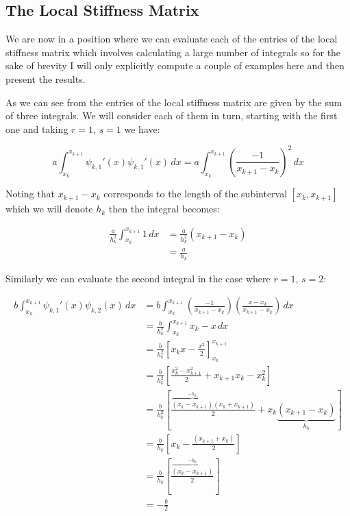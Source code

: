 \subsection{The Local Stiffness Matrix}\label{sec:oned-deterministic-local-stiffness}

We are now in a position where we can evaluate each of the entries of the local
stiffness matrix which involves calculating a large number of integrals so for
the sake of brevity I will only explicitly compute a couple of examples here
and then present the results.

As we can see from  the entries of
the local stiffness matrix are given by the sum of three integrals. We will
consider each of them in turn, starting with the first one and taking $r = 1$,
$s = 1$ we have:

\begin{equation*}
       a\int_{x_k}^{x_{k+1}}\psi_{k,1}'(x)\psi_{k,1}'(x)\, dx =
         a\int_{x_k}^{x_{k+1}}\left(\frac{-1}{x_{k+1} - x_k}\right)^2\, dx
\end{equation*}

Noting that $x_{k+1} - x_k$ corresponds to the length of the subinterval
$[x_k, x_{k+1}]$ which we will denote $h_k$ then the integral becomes:

\begin{align*}
    \frac{a}{h_k^2}\int_{x_k}^{x_{k+1}}1\, dx &= \frac{a}{h_k^2}(x_{k+1} - x_k) \\
          &= \frac{a}{h_k}
\end{align*}

Similarly we can evaluate the second integral in the case where $r=1$, $s=2$:

\begin{align*}
    b\int_{x_k}^{x_{k+1}}\psi_{k,1}'(x)\psi_{k,2}(x)\, dx
      &=  b\int_{x_k}^{x_{k+1}}\left(\frac{-1}{x_{k+1} - x_k}\right)
                               \left(\frac{x - x_k}{x_{k+1} - x_k}\right)\, dx \\
      &= \frac{b}{h_k^2}\int_{x_k}^{x_{k+1}}x_k - x\, dx \\
      &= \frac{b}{h_k^2}\left[x_kx - \frac{x^2}{2}\right]_{x_k}^{x_{k+1}} \\
      &= \frac{b}{h_k^2}\left[ \frac{x_k^2 - x_{k+1}^2}{2} + x_{k+1}x_k - x_k^2 \right] \\
      &= \frac{b}{h_k^2}\left[ \frac{\overbrace{(x_k - x_{k+1})}^{-h_k}(x_k + x_{k+1})}{2}
              + x_k\underbrace{(x_{k+1} - x_k)}_{h_k}\right] \\
      &= \frac{b}{h_k}\left[ x_k - \frac{(x_{k+1} + x_k)}{2} \right] \\
      &= \frac{b}{h_k}\left[\frac{\overbrace{(x_k - x_{k+1})}^{-h_k}}{2}\right] \\
      &= -\frac{b}{2}
\end{align*}

